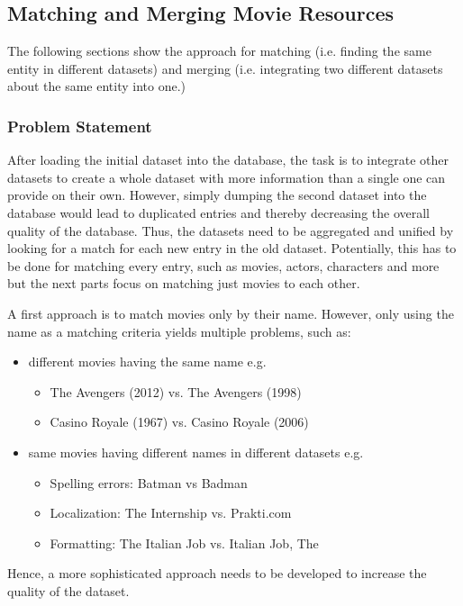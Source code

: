 \subsection{Matching and Merging Movie Resources}
\label{subsec_method_matching}

The following sections show the approach for matching (i.e. finding the same entity in different datasets) and merging (i.e. integrating two different datasets about the same entity into one.)

\subsubsection{Problem Statement}
After loading the initial dataset into the database, the task is to integrate other datasets to create a whole dataset with more information than a single one can provide on their own.
However, simply dumping the second dataset into the database would lead to duplicated entries and thereby decreasing the overall quality of the database.
Thus, the datasets need to be aggregated and unified by looking for a match for each new entry in the old dataset.
Potentially, this has to be done for matching every entry, such as movies, actors, characters and more but the next parts focus on matching just movies to each other.

A first approach is to match movies only by their name.
However, only using the name as a matching criteria yields multiple problems, such as:
\begin{itemize}
	\item different movies having the same name e.g.
	\begin{itemize}
        \item The Avengers (2012) vs. The Avengers (1998)
        \item Casino Royale (1967) vs. Casino Royale (2006)
    \end{itemize}
	\item same movies having different names in different datasets e.g.
	\begin{itemize}
        \item Spelling errors: Batman vs Badman
        \item Localization: The Internship vs. Prakti.com
        \item Formatting: The Italian Job vs. Italian Job, The
     \end{itemize}
\end{itemize}
Hence, a more sophisticated approach needs to be developed to increase the quality of the dataset.

